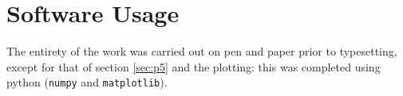 \documentclass[draft]{agujournal2019}
\begin{document}
\clearpage
\section{Software Usage}
The entirety of the work was carried out on pen and paper prior to typesetting, except for that of section \ref{sec:p5} and the plotting: this was completed using python (\verb|numpy| and \verb|matplotlib|). 

\newpage















%
\end{document}
